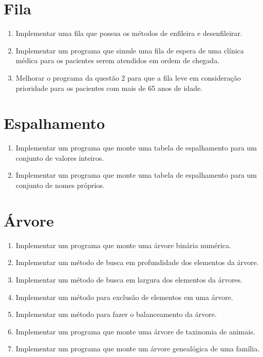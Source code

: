 \documentclass[11pt]{article}
\begin{document}
\newpage
\section{Fila}

\begin{enumerate}
	
	\item Implementar uma fila que possua os métodos de enfileira e desenfileirar.
	
	\item Implementar um programa que  simule uma fila de espera de uma clínica médica para os pacientes serem atendidos em ordem de chegada.
	
	\item Melhorar o programa da questão 2 para que a fila leve em consideração prioridade para os pacientes com mais de 65 anos de idade.
\end{enumerate}

\newpage
\section{Espalhamento}

\begin{enumerate}
	\item Implementar um programa que monte uma tabela de espalhamento para um conjunto de valores inteiros.
	
	\item Implementar um programa que monte uma tabela de espalhamento para um conjunto de nomes próprios.
\end{enumerate}

\newpage
\section{Árvore}

\begin{enumerate}
	
	\item Implementar um programa que monte uma árvore binária numérica.
	
	\item Implementar um método de busca em profundidade dos elementos da árvore.
	
	\item Implementar um método de busca em largura dos elementos da árvores.
	
	\item Implementar um método para exclusão de elementos em uma árvore. 
	
	\item Implementar um método para fazer o balanceamento da árvore.
	
	\item Implementar um programa que monte uma árvore de taxinomia de animais.
	
	\item Implementar um programa que monte um árvore genealógica de uma família.
	
\end{enumerate}
\end{document}
